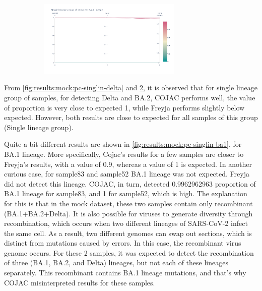 \begin{figure}[H]
                    \begin{subfigure}{\linewidth}
                	\centering
                    \includegraphics[width=0.75\textwidth]{figures/results/mock/pc-singlin-ba2.png}
                    \label{fig:results:mock:pc-singlin-ba2}
                    \end{subfigure}\par\medskip
                \end{figure}
                
                From \cref{fig:results:mock:pc-singlin-delta} and \cref{fig:results:mock:pc-singlin-ba2}, it is observed that for single lineage group of samples, for detecting Delta and BA.2, COJAC performs well, the value of proportion is very close to expected 1, while Freyja performs slightly below expected. However, both results are close to expected for all samples of this group (Single lineage group).

                Quite a bit different results are shown in \cref{fig:results:mock:pc-singlin-ba1}, for BA.1 lineage. More specifically, Cojac’s results for a few samples are closer to Freyja’s results, with a value of 0.9, whereas a value of 1 is expected. In another curious case, for sample83 and sample52 BA.1 lineage was not expected. Freyja did not detect this lineage. COJAC, in turn, detected 0.9962962963 proportion of BA.1 lineage for sample83, and 1 for sample52, which is high. The explanation for this is that in the mock dataset, these two samples contain only recombinant (BA.1+BA.2+Delta). It is also possible for viruses to generate diversity through recombination, which occurs when two different lineages of SARS-CoV-2 infect the same cell. As a result, two different genomes can swap out sections, which is distinct from mutations caused by errors. In this case, the recombinant virus genome occurs.
                For these 2 samples, it was expected to detect the recombination of three (BA.1, BA.2, and Delta) lineages, but not each of these lineages separately. This recombinant contains BA.1 lineage mutations, and that's why COJAC misinterpreted results for these samples.

